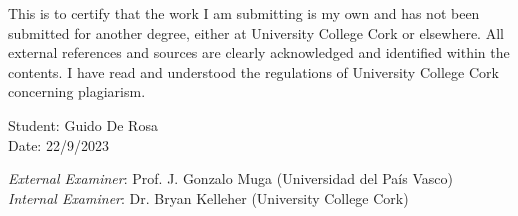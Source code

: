 This is to certify that the work I am submitting is my own and has not been
submitted for another degree, either at University College Cork or elsewhere. All
external references and sources are clearly acknowledged and identified within the
contents. I have read and understood the regulations of University College Cork
concerning plagiarism.

\hfill

\noindent Student: Guido De Rosa \\
\noindent Date: 22/9/2023

\hfill

\hfill

\noindent \emph{External Examiner}: Prof. J. Gonzalo Muga (Universidad del Pa\'{i}s Vasco)\\
\noindent \emph{Internal Examiner}: Dr. Bryan Kelleher (University College Cork)
